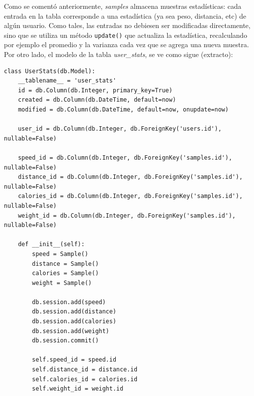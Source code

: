 \documentclass[11pt,letterpaper]{article}
\begin{document}
Como se comentó anteriormente, \emph{samples} almacena muestras estadísticas: cada entrada en la tabla corresponde a una estadística (ya sea peso, distancia, etc) de algún usuario. Como tales, las entradas no debiesen ser modificadas directamente, sino que se utiliza un método  \texttt{update()} que actualiza la estadística, recalculando por ejemplo el promedio y la varianza cada vez que se agrega una nueva muestra.\\
\newpage
Por otro lado, el modelo de la tabla \emph{user\_stats}, se ve como sigue (extracto):
\begin{lstlisting}[title=Modelo de la tabla \emph{user\_stats} (extracto)]
class UserStats(db.Model):
    __tablename__ = 'user_stats'
    id = db.Column(db.Integer, primary_key=True)
    created = db.Column(db.DateTime, default=now)
    modified = db.Column(db.DateTime, default=now, onupdate=now)

    user_id = db.Column(db.Integer, db.ForeignKey('users.id'), nullable=False)

    speed_id = db.Column(db.Integer, db.ForeignKey('samples.id'), nullable=False)
    distance_id = db.Column(db.Integer, db.ForeignKey('samples.id'), nullable=False)
    calories_id = db.Column(db.Integer, db.ForeignKey('samples.id'), nullable=False)
    weight_id = db.Column(db.Integer, db.ForeignKey('samples.id'), nullable=False)

    def __init__(self):
        speed = Sample()
        distance = Sample()
        calories = Sample()
        weight = Sample()

        db.session.add(speed)
        db.session.add(distance)
        db.session.add(calories)
        db.session.add(weight)
        db.session.commit()

        self.speed_id = speed.id
        self.distance_id = distance.id
        self.calories_id = calories.id
        self.weight_id = weight.id
\end{lstlisting}
\end{document}
